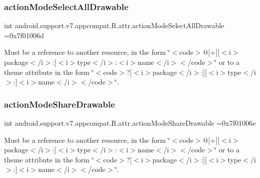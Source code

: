 \subsubsection{\texorpdfstring{action\+Mode\+Select\+All\+Drawable}{actionModeSelectAllDrawable}}
{\footnotesize\ttfamily int android.\+support.\+v7.\+appcompat.\+R.\+attr.\+action\+Mode\+Select\+All\+Drawable =0x7f01006d\hspace{0.3cm}{\ttfamily [static]}}

Must be a reference to another resource, in the form \char`\"{}$<$code$>$@\mbox{[}+\mbox{]}\mbox{[}$<$i$>$package$<$/i$>$\+:\mbox{]}$<$i$>$type$<$/i$>$\+:$<$i$>$name$<$/i$>$$<$/code$>$\char`\"{} or to a theme attribute in the form \char`\"{}$<$code$>$?\mbox{[}$<$i$>$package$<$/i$>$\+:\mbox{]}\mbox{[}$<$i$>$type$<$/i$>$\+:\mbox{]}$<$i$>$name$<$/i$>$$<$/code$>$\char`\"{}. \mbox{\label{classandroid_1_1support_1_1v7_1_1appcompat_1_1R_1_1attr_a84010075b7707f56261c42ead124d7e4}} 
\subsubsection{\texorpdfstring{action\+Mode\+Share\+Drawable}{actionModeShareDrawable}}
{\footnotesize\ttfamily int android.\+support.\+v7.\+appcompat.\+R.\+attr.\+action\+Mode\+Share\+Drawable =0x7f01006e\hspace{0.3cm}{\ttfamily [static]}}

Must be a reference to another resource, in the form \char`\"{}$<$code$>$@\mbox{[}+\mbox{]}\mbox{[}$<$i$>$package$<$/i$>$\+:\mbox{]}$<$i$>$type$<$/i$>$\+:$<$i$>$name$<$/i$>$$<$/code$>$\char`\"{} or to a theme attribute in the form \char`\"{}$<$code$>$?\mbox{[}$<$i$>$package$<$/i$>$\+:\mbox{]}\mbox{[}$<$i$>$type$<$/i$>$\+:\mbox{]}$<$i$>$name$<$/i$>$$<$/code$>$\char`\"{}. \mbox{\label{classandroid_1_1support_1_1v7_1_1appcompat_1_1R_1_1attr_a599a8a1861414f1a5724072321e93195}} 
